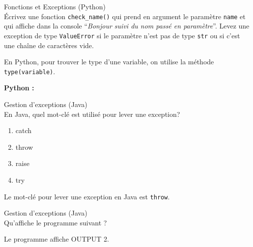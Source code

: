 \begin{Exercice}[10 minutes]Fonctions et Exceptions (Python)\\

    Écrivez une fonction \lstinline{check_name()} qui prend en argument le paramètre \lstinline{name} et qui affiche dans la console ``\textit{Bonjour suivi du nom passé en paramètre}''.
    Levez une exception de type \lstinline{ValueError} si le paramètre n'est pas de type \lstinline{str} ou si c'est une chaîne de caractères vide.

    \begin{conseil}
       En Python, pour trouver le type d'une variable, on utilise la méthode \lstinline{type(variable)}.
    \end{conseil}
    
    \begin{solution}   
        \textbf{Python :}
        
    \end{solution}
    
    \end{Exercice}

\begin{Exercice}[5 minutes]Gestion d'exceptions (Java)\\

    En Java, quel mot-clé est utilisé pour lever une exception?

    \begin{enumerate}
        \item catch
        \item throw
        \item raise 
        \item try
    \end{enumerate}
    
    \begin{solution}   
    Le mot-clé pour lever une exception en Java est \lstinline{throw}.
        
    \end{solution}
        
 \end{Exercice}

 \begin{Exercice}[5 minutes]Gestion d'exceptions (Java)\\

    Qu'affiche le programme suivant ?
    

    
        
        \begin{solution}   
        Le programme affiche OUTPUT 2.             
        \end{solution}
        
 \end{Exercice}




